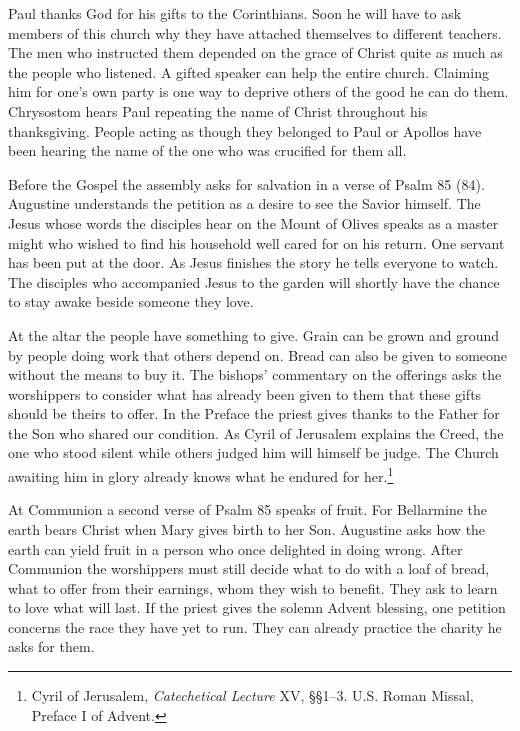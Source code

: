 \newpage
Paul thanks God for his gifts to the Corinthians. Soon he will have to ask members of this church why they have attached themselves to different teachers. The men who instructed them depended on the grace of Christ quite as much as the people who listened. A gifted speaker can help the entire church. Claiming him for one's own party is one way to deprive others of the good he can do them. Chrysostom hears Paul repeating the name of Christ throughout his thanksgiving. People acting as though they belonged to Paul or Apollos have been hearing the name of the one who was crucified for them all.

Before the Gospel the assembly asks for salvation in a verse of Psalm 85 (84). Augustine understands the petition as a desire to see the Savior himself. The Jesus whose words the disciples hear on the Mount of Olives speaks as a master might who wished to find his household well cared for on his return. One servant has been put at the door. As Jesus finishes the story he tells everyone to watch. The disciples who accompanied Jesus to the garden will shortly have the chance to stay awake beside someone they love.

At the altar the people have something to give. Grain can be grown and ground by people doing work that others depend on. Bread can also be given to someone without the means to buy it. The bishops' commentary on the offerings asks the worshippers to consider what has already been given to them that these gifts should be theirs to offer. In the Preface the priest gives thanks to the Father for the Son who shared our condition. As Cyril of Jerusalem explains the Creed, the one who stood silent while others judged him will himself be judge. The Church awaiting him in glory already knows what he endured for her.\footnote{Cyril of Jerusalem, \textit{Catechetical Lecture} XV, §§1--3. U.S. Roman Missal, Preface I of Advent.}

At Communion a second verse of Psalm 85 speaks of fruit. For Bellarmine the earth bears Christ when Mary gives birth to her Son. Augustine asks how the earth can yield fruit in a person who once delighted in doing wrong. After Communion the worshippers must still decide what to do with a loaf of bread, what to offer from their earnings, whom they wish to benefit. They ask to learn to love what will last. If the priest gives the solemn Advent blessing, one petition concerns the race they have yet to run. They can already practice the charity he asks for them.
\clearpage
